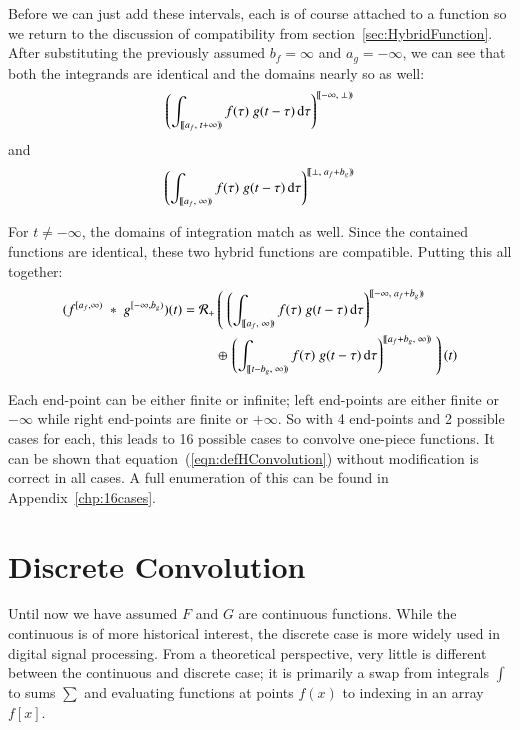 Before we can just add these intervals, each is of course attached to a function so we return to the discussion of compatibility
from section~\ref{sec:HybridFunction}.
After substituting the previously assumed $b_f = \infty$ and $a_g=-\infty$, we can see that both the integrands are
identical and the domains nearly so as well:
\begin{equation*}
	\left( \int_{[\![a_f,\;t+\infty)\!)} f(\tau) \; g(t-\tau) \mathop{}\!\mathrm{d}\tau \right)^{[\![-\infty,\; \bot )\!)} 
\end{equation*}
and
\begin{equation*}
	\left( \int_{[\![a_f,\;\infty)\!)} f(\tau) \; g(t-\tau) \mathop{}\!\mathrm{d}\tau \right)^{[\![\bot,\; a_f+b_g)\!)} 
\end{equation*}


For $t \neq -\infty$, the domains of integration match as well.
Since the contained functions are identical, these two hybrid functions are compatible.
Putting this all together:
\begin{align}
	(f^{[a_f,\infty)} \;*\; g^{[-\infty,b_g)}) (t) = 
		\R[+] &\left( \; \left( 
			\int_{[\![a_f,\;\infty)\!)} f(\tau) \; g(t-\tau) \diff\tau \right)^{[\![-\infty,\; a_f+b_g)\!)} 
				\right. \notag \\ &\oplus \left. \left( 
			\int_{[\![t-b_g,\;\infty)\!)} f(\tau) \; g(t-\tau) \diff\tau \right)^{[\![a_f+b_g,\; \infty)\!)} 
				\; \right)(t)
\end{align}


Each end-point can be either finite or infinite; left end-points are either finite or $-\infty$ while right end-points are finite
or $+\infty$.
So with 4 end-points and 2 possible cases for each, this leads to 16 possible cases to convolve one-piece functions.
It can be shown that equation~(\ref{eqn:defHConvolution}) without modification is correct in all cases.
A full enumeration of this can be found in Appendix~\ref{chp:16cases}.

%
%
\section{Discrete Convolution}

Until now we have assumed $F$ and $G$ are continuous functions. 
While the continuous is of more historical interest, the discrete case is more widely used in digital signal processing.
From a theoretical perspective, very little is different between the continuous and discrete case; it is primarily a swap
from integrals $\int$ to sums $\sum$ and evaluating functions at points $f(x)$ to indexing in an array $f[x]$.




